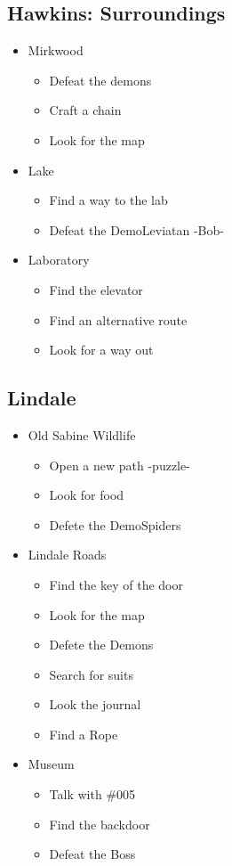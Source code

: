 \subsection{Hawkins: Surroundings}
\begin{itemize}
	\item Mirkwood
	\begin{itemize}
		\item Defeat the demons
		\item Craft a chain
		\item Look for the map
	\end{itemize}
	\item Lake
	\begin{itemize}
		\item Find a way to the lab
		\item Defeat the DemoLeviatan -Bob-
	\end{itemize}
	\item Laboratory
	\begin{itemize}
		\item Find the elevator
		\item Find an alternative route
		\item Look for a way out
	\end{itemize}
\end{itemize}

\subsection{Lindale}
\begin{itemize}
	\item Old Sabine Wildlife
	\begin{itemize}
		\item Open a new path -puzzle-
		\item Look for food
		\item Defete the DemoSpiders
	\end{itemize}
	\item Lindale Roads
	\begin{itemize}	
		\item Find the key of the door
		\item Look for the map
		\item Defete the Demons
		\item Search for suits
		\item Look the journal
		\item Find a Rope
	\end{itemize}
	\item Museum
	\begin{itemize}
		\item Talk with \#005
		\item Find the backdoor
		\item Defeat the Boss
	\end{itemize}
\end{itemize}

